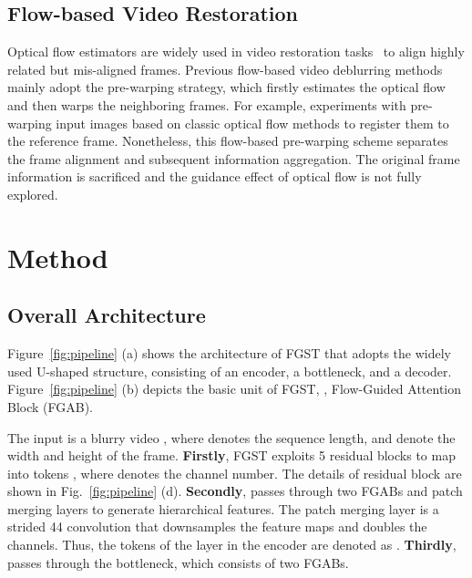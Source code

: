 \documentclass{article}
\begin{document}
	\vspace{-1mm}
	\subsection{Flow-based Video Restoration}
	\vspace{-1mm}
	Optical flow estimators are widely used in video restoration tasks~\cite{gast2019deep,xue2019video,gong2017motion,sun2015learning,makansi2017end,Su,tsp} to align highly related but mis-aligned frames. Previous flow-based video deblurring  methods~\cite{xue2019video,makansi2017end,Su,tsp,gast2019deep} mainly adopt the pre-warping strategy, which firstly estimates the optical flow and then warps the neighboring frames. For example, \cite{Su} experiments with pre-warping input images based on classic optical flow methods to register them to the reference frame. Nonetheless, this flow-based pre-warping scheme separates the frame alignment and subsequent information aggregation. The original frame information is sacrificed and the guidance effect of optical flow is not fully explored. 
	
	\vspace{-1.5mm}
	\section{Method}
	\vspace{-0.5mm}
	\subsection{Overall Architecture}
	Figure~\ref{fig:pipeline} (a) shows the architecture of FGST that adopts the widely used U-shaped structure, consisting of an encoder, a bottleneck, and a decoder. Figure~\ref{fig:pipeline} (b) depicts the basic unit of FGST, , Flow-Guided Attention Block (FGAB). 
	
	The input is a blurry video , where  denotes the sequence length,  and  denote the width and height of the frame. \textbf{Firstly}, FGST exploits 5 residual blocks to map  into tokens , where  denotes the channel number. The details of residual block are shown in Fig.~\ref{fig:pipeline} (d). \textbf{Secondly},  passes through two FGABs and patch merging layers to generate hierarchical features. The patch merging layer is a strided 44 convolution that downsamples the feature maps and doubles the channels. Thus, the  tokens of the  layer in the encoder are denoted as . \textbf{Thirdly},  passes through the bottleneck, which consists of two FGABs.
	
\end{document}
